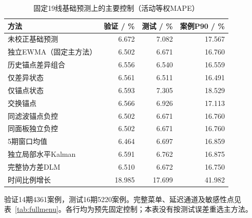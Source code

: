 \begin{table}[!htbp]\centering
\caption{固定19线基础预测上的主要控制（活动等权MAPE）}\label{tab:main}
\small\setlength{\tabcolsep}{4pt}\renewcommand{\arraystretch}{1.15}
\begin{tabularx}{\linewidth}{L r r r}\toprule
方法 & 验证 / \% & 测试 / \% & 案例P90 / \% \\
\midrule
未校正基础预测 & 6.672 & 7.082 & 17.567 \\
独立EWMA（固定主方法） & 6.502 & 6.671 & 16.760 \\
历史锚点差异组合 & 6.556 & 6.540 & 16.559 \\
仅差异状态 & 6.561 & 6.511 & 16.491 \\
仅锚点状态 & 6.593 & 7.305 & 18.529 \\
交换锚点 & 6.566 & 6.926 & 17.113 \\
同滤波锚点负控 & 6.502 & 6.671 & 16.760 \\
同面板独立负控 & 6.502 & 6.671 & 16.760 \\
5期窗口均值 & 6.464 & 6.697 & 16.859 \\
独立局部水平Kalman & 6.591 & 6.762 & 16.875 \\
完整协方差DLM & 6.510 & 6.672 & 16.750 \\
时间比例增长 & 18.985 & 17.699 & 41.982 \\
\bottomrule\end{tabularx}
\par\vspace{4pt}\begin{minipage}{\linewidth}\footnotesize 验证14期4361案例，测试16期5220案例。完整菜单、延迟通道及敏感性点见表~\ref{tab:fullmenu}。各行均为预先固定控制；本表没有按测试误差重选主方法。\end{minipage}
\end{table}
